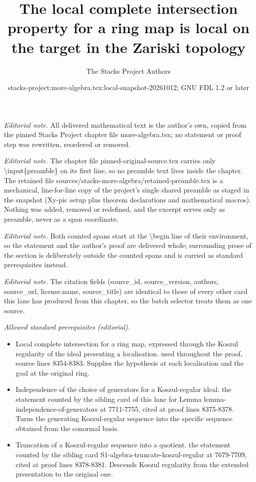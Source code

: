 \documentclass[10pt,a4paper]{amsart}
\title{The local complete intersection property for a ring map is local on the target in the Zariski topology}
\author{The Stacks Project Authors}
\date{stacks-project:more-algebra.tex:local-snapshot-20261012; GNU FDL 1.2 or later}
\theoremstyle{plain}
\theoremstyle{definition}
\theoremstyle{remark}
\numberwithin{equation}{subsection}
\begin{document}
\maketitle
\setcounter{subsection}{1}
\noindent\textit{Editorial note.} All delivered mathematical text is the author's own, copied from the pinned Stacks Project chapter file more-algebra.tex; no statement or proof step was rewritten, reordered or removed.\par\medskip
\noindent\textit{Editorial note.} The chapter file pinned-original-source.tex carries only \textbackslash{}input\{preamble\} on its first line, so no preamble text lives inside the chapter. The retained file sources/stacks-more-algebra/retained-preamble.tex is a mechanical, line-for-line copy of the project's single shared preamble as staged in the snapshot (Xy-pic setup plus theorem declarations and mathematical macros). Nothing was added, removed or redefined, and the excerpt serves only as preamble, never as a span coordinate.\par\medskip
\noindent\textit{Editorial note.} Both counted spans start at the \textbackslash{}begin line of their environment, so the statement and the author's proof are delivered whole; surrounding prose of the section is deliberately outside the counted spans and is carried as standard prerequisites instead.\par\medskip
\noindent\textit{Editorial note.} The citation fields (source\_id, source\_version, authors, source\_url, license.name, source\_title) are identical to those of every other card this lane has produced from this chapter, so the batch selector treats them as one source.\par\medskip
\noindent\textit{Allowed standard prerequisites (editorial).}\begin{itemize}
\item Local complete intersection for a ring map, expressed through the Koszul regularity of the ideal presenting a localisation. used throughout the proof, source lines 8354-8383. Supplies the hypothesis at each localisation and the goal at the original ring.
\item Independence of the choice of generators for a Koszul-regular ideal. the statement counted by the sibling card of this lane for Lemma lemma-independence-of-generators at 7711-7755, cited at proof lines 8375-8378. Turns the generating Koszul-regular sequence into the specific sequence obtained from the conormal basis.
\item Truncation of a Koszul-regular sequence into a quotient. the statement counted by the sibling card S1-algebra-truncate-koszul-regular at 7679-7709, cited at proof lines 8378-8381. Descends Koszul regularity from the extended presentation to the original one.
\end{itemize}\medskip
\end{document}
